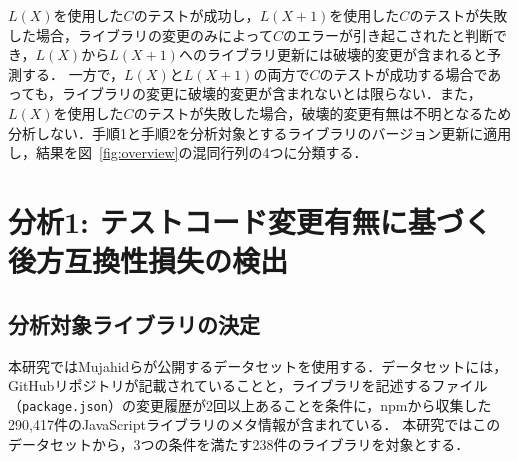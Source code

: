 \documentclass[submit]{ipsj}
\begin{document}


$L(X)$を使用した$C$のテストが成功し，$L(X+1)$を使用した$C$のテストが失敗した場合，ライブラリの変更のみによって$C$のエラーが引き起こされたと判断でき，$L(X)$から$L(X+1)$へのライブラリ更新には破壊的変更が含まれると予測する．
一方で，$L(X)$と$L(X+1)$の両方で$C$のテストが成功する場合であっても，ライブラリの変更に破壊的変更が含まれないとは限らない．また，$L(X)$を使用した$C$のテストが失敗した場合，破壊的変更有無は不明となるため分析しない．手順1と手順2を分析対象とするライブラリのバージョン更新に適用し，結果を図~\ref{fig:overview}の混同行列の4つに分類する．


\section{分析1: テストコード変更有無に基づく後方互換性損失の検出}
\label{sec:prepare}


\subsection{分析対象ライブラリの決定}
本研究ではMujahidらが公開するデータセット\cite{mujahid}を使用する．データセットには，GitHubリポジトリが記載されていることと，ライブラリを記述するファイル（{\verb|package.json|}）の変更履歴が2回以上あることを条件に，npmから収集した290,417件のJavaScriptライブラリのメタ情報が含まれている．
本研究ではこのデータセットから，3つの条件を満たす238件のライブラリを対象とする．
\end{document}
